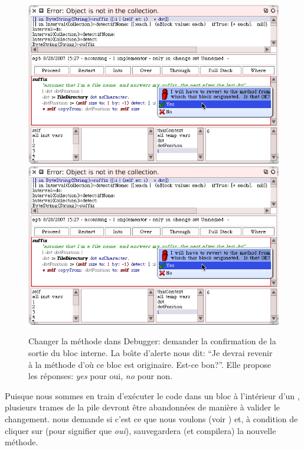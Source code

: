 \documentclass[a4paper,10pt,twoside]{book}
\begin{document}
\begin{figure}[btp]
	\begin{center}
	\ifluluelse
		{\includegraphics[width=\textwidth]{revertDialog}}
		{\includegraphics[scale=0.7]{revertDialog}}
	\end{center}
	\caption{Changer la m\'ethode  dans Debugger: demander la confirmation de la sortie du bloc interne. La bo\^{\i}te d'alerte nous dit: ``Je devrai revenir \`a la m\'ethode d'o\`u ce bloc est originaire. Est-ce bon?''. Elle propose les r\'eponses: \emph{yes} pour oui, \emph{no} pour non.}
	\label{fig:revertDialog}
\end{figure}

Puisque nous sommes en train d'ex\'ecuter le code dans un bloc \`a l'int\'erieur d'un , plusieurs trames de la pile 
devront \^etre abandonn\'ees de mani\`ere \`a valider le changement.
\pharo nous demande si c'est ce que nous voulons (voir )
et, \`a condition de cliquer sur  (pour signifier que \emph{oui}), \pharo sauvegardera
(et compilera) la nouvelle m\'ethode.
\end{document}
